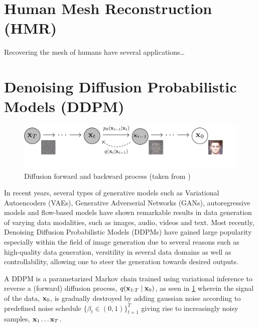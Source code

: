 \section{Human Mesh Reconstruction (HMR)}
Recovering the mesh of humans have several applications\dots

\section{Denoising Diffusion Probabilistic Models (DDPM)}
\begin{figure}[H]
    \centering
    \includegraphics[width=\linewidth]{figures/pgm_diagram_xarrow_small.pdf}
    \caption{Diffusion forward and backward process (taken from \cite{ho2020denoising})}
    \label{fig:diffusion-process}
\end{figure}
In recent years, several types of generative models such as Variational Autoencoders (VAEs), Generative Adverserial Networks (GANs), autoregressive models and flow-based models have shown remarkable results in data generation of varying data modalities, such as images, audio, videos and text. Most recently, Denoising Diffusion Probabilistic Models (DDPMs) have gained large popularity especially within the field of image generation due to several reasons such as high-quality data generation, versitility in several data domains as well as controllability, allowing one to steer the generation towards desired outputs.

A DDPM is a parametarized Markov chain trained using variational inference to reverse a (forward) diffusion process, $q(\boldsymbol{\mathbf{x}}_{1:T} \mid \boldsymbol{\mathbf{x}}_0)$, as seen in \cref{fig:diffusion-process} wherein the signal of the data, $\boldsymbol{\mathbf{x}}_0$, is gradually destroyed by adding gaussian noise according to predefined noise schedule $\{\beta_t  \in (0,1) \}_{t=1}^T$ giving rise to increasingly noisy samples, $\boldsymbol{\mathbf{x}}_1 \ldots \boldsymbol{\mathbf{x}}_T$. 

